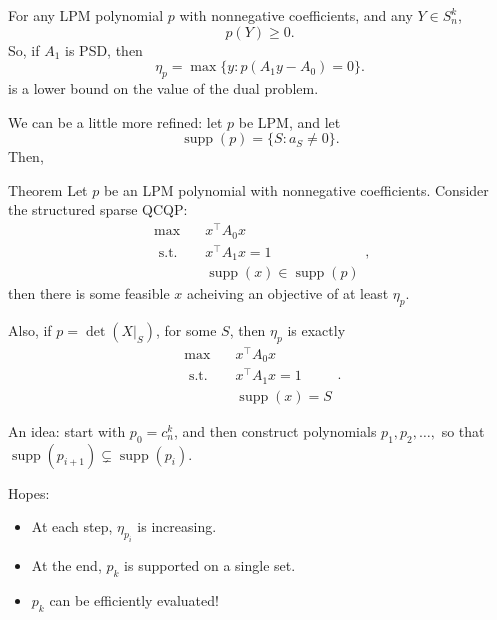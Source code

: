 \documentclass{beamer}
\DeclareMathOperator*{\supp}{supp}
\newcommand{\st}{{\text{ s.t. }}}
\begin{document}
\begin{frame}
    For any LPM polynomial $p$ with nonnegative coefficients, and any $Y \in S^k_n$, 
    \[
        p(Y) \ge 0.
    \]
    \pause
    So, if $A_1$ is PSD, then 
    \[
        \eta_p = \max \{y : p(A_1y-A_0) = 0 \}.
    \]
    is a lower bound on the value of the dual problem.
\end{frame}
\begin{frame}
    We can be a little more refined: let $p$ be LPM, and let 
    \[
        \supp(p) = \{S : a_S \neq 0\}.
    \]
    \pause
    Then,
    \begin{block}{Theorem}
        Let $p$ be an LPM polynomial with nonnegative coefficients.
        Consider the structured sparse QCQP:
        \begin{equation}
            \begin{aligned}
                \max\quad & x^{\intercal}A_0x\\
                \st & x^{\intercal}A_1x = 1\\
                    & \supp(x) \in \supp(p)
            \end{aligned},
        \end{equation}
        then there is some feasible $x$ acheiving an objective of at least $\eta_p$.
    \end{block}
\end{frame}
\begin{frame}
    Also, if $p = \det(X|_S)$, for some $S$, then $\eta_p$ is exactly
    \begin{equation}
        \begin{aligned}
            \max\quad & x^{\intercal}A_0x\\
            \st & x^{\intercal}A_1x = 1\\
                & \supp(x) = S
        \end{aligned}.
    \end{equation}
\end{frame}
\begin{frame}
    An idea: start with $p_0 = c_n^k$, and then construct polynomials $p_1,p_2 ,\dots, $ so that $\supp(p_{i+1}) \subsetneq \supp(p_{i})$.

    Hopes:
    \begin{itemize}
        \item At each step, $\eta_{p_i}$ is increasing.
        \item At the end, $p_k$ is supported on a single set.
        \pause
        \item $p_k$ can be efficiently evaluated!
    \end{itemize}
\end{frame}
\end{document}
